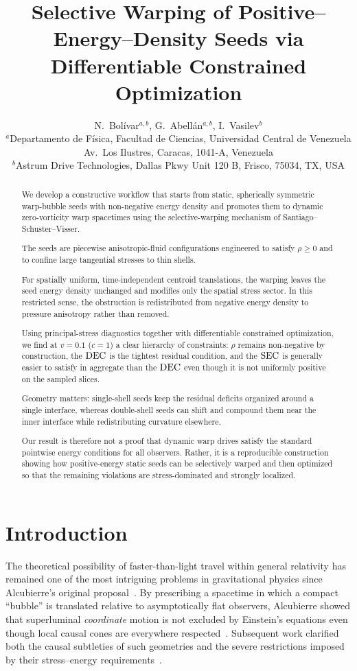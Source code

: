 \documentclass[11pt]{article}
\title{Selective Warping of Positive--Energy--Density Seeds via Differentiable Constrained Optimization}
\author{N.~Bol\'ivar$^{a,b}$, G.~Abell\'an$^{a,b}$, I.~Vasilev$^b$ \\
$^a$Departamento de F\'isica, Facultad de Ciencias, Universidad Central de Venezuela \\
Av.~Los Ilustres, Caracas, 1041-A, Venezuela \\
$^b$Astrum Drive Technologies, Dallas Pkwy Unit 120 B, Frisco, 75034, TX, USA}
\date{}
\makeatletter
\newcommand{\@abbr}[1]{\ifmmode\mathrm{#1}\else\textsc{#1}\fi}
\newcommand{\SEC}{\@abbr{SEC}}
\newcommand{\DEC}{\@abbr{DEC}}
\makeatother
\begin{document}
\maketitle

\begin{abstract}

We develop a constructive workflow that starts from static, spherically symmetric warp-bubble seeds with non-negative energy density and promotes them to dynamic zero-vorticity warp spacetimes using the selective-warping mechanism of Santiago--Schuster--Visser.

The seeds are piecewise anisotropic-fluid configurations engineered to satisfy $\rho\ge 0$ and to confine large tangential stresses to thin shells.

For spatially uniform, time-independent centroid translations, the warping leaves the seed energy density unchanged and modifies only the spatial stress sector. In this restricted sense, the obstruction is redistributed from negative energy density to pressure anisotropy rather than removed.

Using principal-stress diagnostics together with differentiable constrained optimization, we find at $v=0.1$ ($c=1$) a clear hierarchy of constraints: $\rho$ remains non-negative by construction, the $\DEC$ is the tightest residual condition, and the $\SEC$ is generally easier to satisfy in aggregate than the $\DEC$ even though it is not uniformly positive on the sampled slices.

Geometry matters: single-shell seeds keep the residual deficits organized around a single interface, whereas double-shell seeds can shift and compound them near the inner interface while redistributing curvature elsewhere.

Our result is therefore not a proof that dynamic warp drives satisfy the standard pointwise energy conditions for all observers. Rather, it is a reproducible construction showing how positive-energy static seeds can be selectively warped and then optimized so that the remaining violations are stress-dominated and strongly localized.
\end{abstract}

\section{Introduction}
\label{sec:intro}
The theoretical possibility of faster-than-light travel within general relativity has remained one of the most intriguing problems in gravitational physics since Alcubierre's original proposal~\cite{Alcubierre:1994tu}. By prescribing a spacetime in which a compact ``bubble'' is translated relative to asymptotically flat observers, Alcubierre showed that superluminal \emph{coordinate} motion is not excluded by Einstein's equations even though local causal cones are everywhere respected~\cite{Alcubierre:1994tu,Clark:1999zn,Everett:1995nn}. Subsequent work clarified both the causal subtleties of such geometries and the severe restrictions imposed by their stress--energy requirements~\cite{Pfenning:1997,Olum:1998mu,Low:1998uy,Lobo:2004wq}.
\end{document}
